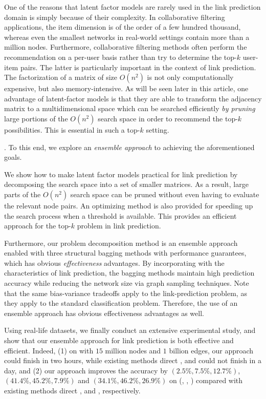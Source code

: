 One of the reasons that latent factor models are rarely used in the
link prediction domain is simply because of their complexity. In
collaborative filtering applications, the item dimension is of the
order of a few hundred thousand, whereas even the smallest networks
in real-world settings contain more than a million nodes.
Furthermore, collaborative filtering methods  often perform the
recommendation on a per-user basis rather than try to determine
the top-$k$ user-item pairs.  The latter is particularly important
in the context of link prediction. The factorization of a matrix of
size $O(n^2)$ is not only computationally expensive, but also
memory-intensive.  As will be seen later in this article, one advantage
of  latent-factor models is that they are able to  transform the
adjacency matrix to a multidimensional space which can be searched
efficiently {\em by pruning} large portions of the $O(n^2)$ search
space in order to recommend the top-$k$ possibilities.
This is essential in such a top-$k$ setting.

. To this end, we explore an {\em ensemble approach} to
achieving the aforementioned goals.

We show how to make latent factor models
practical for link prediction by decomposing the search space into a
 set of smaller matrices. As a result, large parts of the $O(n^2)$
search space can be pruned without even having to evaluate the
relevant node pairs. An optimizing method is also provided for
speeding up the search process when a threshold is available.
This provides an efficient approach for the
top-$k$ problem in link prediction.

Furthermore, our problem
decomposition method is an ensemble approach enabled with three
structural bagging methods with performance guarantees, which has obvious {\em
effectiveness} advantages. By incorporating with the characteristics of  link prediction, the bagging methods maintain high prediction
accuracy while reducing the network size via graph sampling techniques.
Note that the same bias-variance
tradeoffs apply to the link-prediction problem, as they apply to the
standard classification problem. Therefore, the use of an ensemble
approach has obvious effectiveness advantages as well.

Using real-life datasets, we finally conduct an extensive experimental study, and show that our ensemble approach for link prediction is both effective and efficient. Indeed, (1) on \Friendster with $15$ million nodes and $1$ billion edges, our approach could finish in
two hours, while existing methods direct \NMF, \Aa \cite{adamic} and \BIGCLAM \cite{yang-wsdm2013} could not finish in a day, and
(2) our approach improves the accuracy by $(2.5\%, 7.5\%, 12.7\%)$, $(41.4\%, 45.2\%, 7.9\%)$ and $(34.1\%, 46.2\%, 26.9\%)$ on (\Digg, \YouTube, \Wikipedia)
compared with existing methods  direct \NMF, \Aa and \BIGCLAM, respectively.



